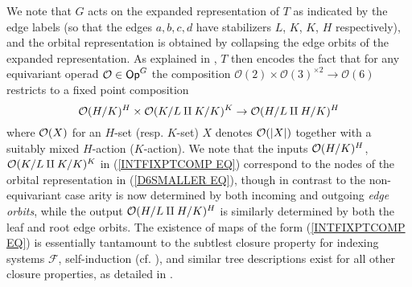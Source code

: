 \documentclass[a4paper,10pt]{article}%
\begin{document}
We note that $G$ acts on the expanded representation of $T$ as indicated by the edge labels (so that the edges $a,b,c,d$ have stabilizers $L$, $K$, $K$, $H$ respectively), and the orbital representation is obtained by collapsing the edge orbits of the expanded representation. As explained in \cite[Example 4.9]{Pe17}, $T$ then encodes the fact that for any 
equivariant operad $\mathcal{O} \in \mathsf{Op}^G$ the composition 
$\mathcal{O}(2) \times \mathcal{O}(3)^{\times 2} \to 
\mathcal{O}(6)$ restricts to a fixed point composition
\begin{equation}\label{INTFIXPTCOMP EQ}
\mathcal{O}(H/K)^{H} \times \mathcal{O}(K/L \amalg K/K)^{K} \to
\mathcal{O}(H/L \amalg H/K)^{H}
\end{equation}
where $\mathcal{O}(X)$ for an $H$-set (resp. $K$-set) $X$ denotes $\mathcal{O}(|X|)$ together with a suitably mixed $H$-action ($K$-action).
We note that the inputs 
$\mathcal{O}(H/K)^{H}$, $\mathcal{O}(K/L \amalg K/K)^{K}$ in
(\ref{INTFIXPTCOMP EQ})
correspond to the nodes of the orbital representation
in (\ref{D6SMALLER EQ}), though in contrast to the non-equivariant case arity is now determined by both incoming and outgoing \textit{edge orbits}, while the output 
$\mathcal{O}(H/L \amalg H/K)^{H}$
is similarly determined by both the leaf and root edge orbits.
The existence of maps of the form (\ref{INTFIXPTCOMP EQ}) is essentially tantamount to the subtlest 
closure property for indexing systems $\mathcal{F}$,
self-induction (cf. \cite[Def. 3.20]{BH15}),
and similar tree descriptions exist for all other closure properties, as detailed in 
\cite[\S 9]{Pe17}.
\end{document}

